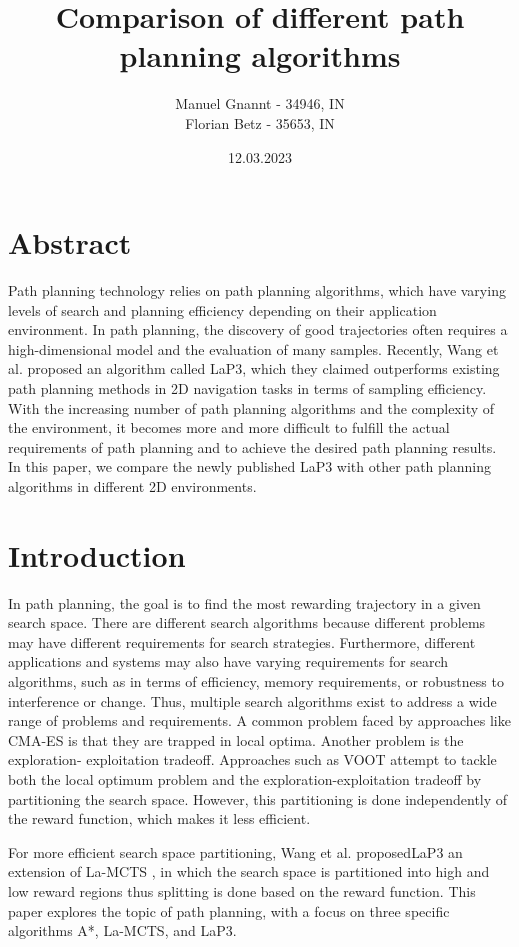 \documentclass[bibliography=totoc]{scrartcl}
\title{Comparison of different path planning algorithms}
\author{Manuel Gnannt - 34946, IN \\ Florian Betz - 35653, IN}
\date{12.03.2023}%
\begin{document}
\maketitle
\tableofcontents

\clearpage
\section{Abstract}
Path planning technology relies on path planning algorithms, which have varying levels of search and planning efficiency depending on their application environment.
In path planning, the discovery of good trajectories often requires a high-dimensional model and the evaluation of many samples.
Recently, Wang et al. proposed an algorithm called \ac{LaP3}, which they claimed outperforms existing path planning methods in 2D navigation tasks in terms of sampling efficiency. 
With the increasing number of path planning algorithms and the complexity of the environment, it becomes more and more difficult to fulfill the actual requirements of path planning and to achieve the desired path planning results.
In this paper, we compare the newly published \ac{LaP3} with other path planning algorithms in different 2D environments.

\section{Introduction}
In path planning, the goal is to find the most rewarding trajectory in a given search space.
There are different search algorithms because different problems may have different requirements for search strategies.
Furthermore, different applications and systems may also have varying requirements for search algorithms, such as in terms of efficiency, memory requirements, or robustness to interference or change. 
Thus, multiple search algorithms exist to address a wide range of problems and requirements.
A common problem faced by approaches like \ac{CMA-ES} \cite{CMA-ES} is that they are trapped in local optima.
Another problem is the exploration- exploitation tradeoff.
Approaches such as \ac{VOOT} \cite{VOOT} attempt to tackle both the local optimum problem and the exploration-exploitation tradeoff by partitioning the search space.
However, this partitioning is done independently of the reward function, which makes it less efficient.

For more efficient search space partitioning, Wang et al. proposed\ac{LaP3} an extension of \ac{La-MCTS} \cite{La-MCTS}, in which the search space is partitioned into high and low reward regions thus splitting is done based on the reward function.
This paper explores the topic of path planning, with a focus on three specific algorithms A*, \ac{La-MCTS}, and \ac{LaP3}. 
\end{document}
